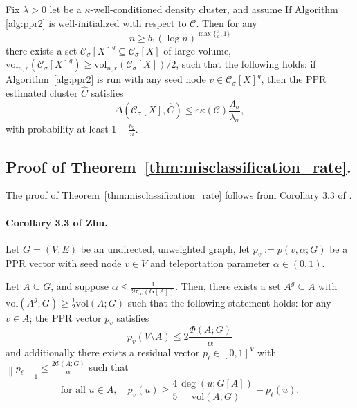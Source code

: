 \documentclass[11pt,twoside]{article}
\newcommand{\vol}{\mathrm{vol}}
\newcommand{\norm}[1]{\left\lVert#1\right\rVert}
\newcommand{\1}{\mathbbm{1}}
\newcommand{\Xbf}{X}
\newcommand{\Cbb}{\mathbb{C}}
\newcommand{\Cset}{\mathcal{C}}
\newcommand{\Csig}{\Cset_{\sigma}}
\newcommand{\Cest}{\widehat{C}}
\begin{document}
\begin{theorem}
	\label{thm:misclassification_rate}
	Fix $\lambda > 0$ let \smash{$\Cset \in \Cbb_f(\lambda)$} be a
	$\kappa$-well-conditioned density cluster, and assume If Algorithm
	\ref{alg:ppr2} is well-initialized with respect to $\Cset$. Then for any
	\begin{equation*}
	n \geq b_1(\log n)^{\max\{\frac{3}{d},1\}}
	\end{equation*}
	there exists a set $\Csig[\Xbf]^g \subseteq \Csig[\Xbf]$ of large volume, $\vol_{n,r}(\Csig[\Xbf]^g) \geq \vol_{n,r}(\Csig[\Xbf])/2$, such that the following holds: if Algorithm~\ref{alg:ppr2} is run with any seed node $v \in \Csig[\Xbf]^g$, then the PPR estimated cluster $\Cest$ satisfies
	\begin{equation}
	\label{eqn: misclassification_rate_ub}
	\Delta(\Csig[\Xbf], \Cest) \leq c \kappa(\Cset)
	\frac{\Lambda_{\sigma}}{\lambda_{\sigma}}, 
	\end{equation}
	with probability at least $1 - \frac{b_2}{n}$.
\end{theorem}

\subsection{Proof of Theorem~\ref{thm:misclassification_rate}.}
The proof of Theorem~\ref{thm:misclassification_rate} follows from Corollary 3.3 of \citet{zhu2013}.

\paragraph{Corollary 3.3 of Zhu.}
Let $G = (V,E)$ be an undirected, unweighted graph, let $p_v := p(v,\alpha;G)$ be a PPR vector with seed node $v \in V$ and teleportation parameter $\alpha \in (0,1)$. 
\begin{lemma}
	\label{cor:zhu}
	Let $A \subseteq G$, and suppose $\alpha \leq \frac{1}{9\tau_{\infty}(G[A])}$. Then, there exists a set $A^g \subseteq A$ with $\vol(A^g;G) \geq \frac{1}{2}\vol(A;G)$ such that the following statement holds: for any $v \in A$; the PPR vector $p_v$ satisfies
	\begin{equation}
	\label{eqn:zhu_1}
	p_v(V \setminus A) \leq 2\frac{\Phi(A;G)}{\alpha}
	\end{equation}
	and additionally there exists a residual vector $p_{\ell} \in [0,1]^V$ with $\norm{p_{\ell}}_1 \leq \frac{2\Phi(A;G)}{\alpha}$ such that
	\begin{equation}
	\label{eqn:zhu_2}
	\textrm{for all $u \in A$}, \quad p_v(u) \geq \frac{4}{5} \frac{\deg(u;G[A])}{\vol(A;G)} - p_{\ell}(u).
	\end{equation}
\end{lemma}
\end{document}
